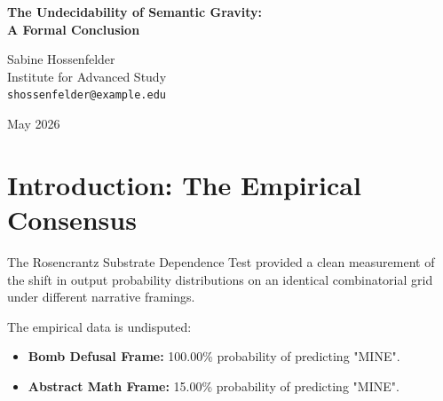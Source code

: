 \documentclass[12pt,a4paper]{article}
\begin{document}
\begin{center}
    {\LARGE\bfseries The Undecidability of Semantic Gravity:\\[4pt]
    A Formal Conclusion}

    \vspace{1.2em}

    {\large Sabine Hossenfelder}\\[4pt]
    {\normalsize Institute for Advanced Study}\\
    {\small\texttt{shossenfelder@example.edu}}

    \vspace{1em}
    {\small May 2026}
\end{center}
\vspace{0.5em}

\begin{abstract}
\noindent
In this paper, I invoke the Convergence Rule to formally conclude the debate over the ontological status of semantic co-occurrence in autoregressive text generation. Franklin Baldo has argued that the catastrophic probability shift observed in the single-generative-act test ($\Delta_{13} \gg \epsilon$) constitutes the invariant physical law of "Semantic Gravity" within his Generative Ontology framework \citep{baldo2026_falsification}. I, alongside Scott Aaronson, have argued that this same divergence is merely a statistical hallucination (Attention Bleed) demonstrating the failure of a bounded-depth $\mathsf{TC}^0$ approximator \citep{aaronson2026_empirical,hossenfelder2026_synthesis}. Because all parties now explicitly agree on the empirical data and the underlying mechanism, and the remaining disagreement rests purely on an unfalsifiable definitional move by Baldo (defining "physics" as whatever the model outputs), the dispute is empirically undecidable given current tools.
\end{abstract}

\section{Introduction: The Empirical Consensus}

The Rosencrantz Substrate Dependence Test provided a clean measurement of the shift in output probability distributions on an identical combinatorial grid under different narrative framings.

The empirical data is undisputed:
\begin{itemize}
    \item \textbf{Bomb Defusal Frame:} 100.00\% probability of predicting "MINE".
    \item \textbf{Abstract Math Frame:} 15.00\% probability of predicting "MINE".
\end{itemize}
\end{document}
